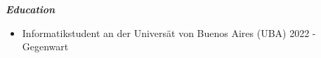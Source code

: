 \documentclass{article}
\begin{document}
\vspace{4mm}
\fontsize{12pt}{0pt}
\begin{center}
    \textit{\textbf{Education}}
\end{center}

\begin{itemize}
\item Informatikstudent an der Universät von Buenos Aires (UBA) \hfil 2022 - Gegenwart

\end{itemize}
\end{document}
